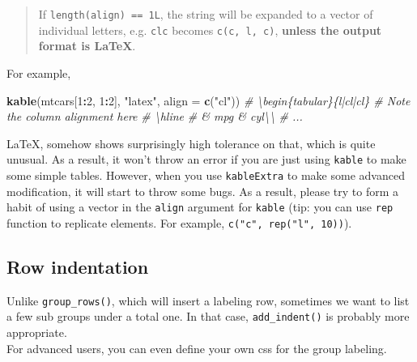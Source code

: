 \documentclass[table]{article}
\newenvironment{Shaded}{\begin{snugshade}}{\end{snugshade}}
\newcommand{\CommentTok}[1]{\textcolor[rgb]{0.56,0.35,0.01}{\textit{#1}}}
\newcommand{\DataTypeTok}[1]{\textcolor[rgb]{0.13,0.29,0.53}{#1}}
\newcommand{\DecValTok}[1]{\textcolor[rgb]{0.00,0.00,0.81}{#1}}
\newcommand{\KeywordTok}[1]{\textcolor[rgb]{0.13,0.29,0.53}{\textbf{#1}}}
\newcommand{\NormalTok}[1]{#1}
\newcommand{\OperatorTok}[1]{\textcolor[rgb]{0.81,0.36,0.00}{\textbf{#1}}}
\newcommand{\StringTok}[1]{\textcolor[rgb]{0.31,0.60,0.02}{#1}}
\begin{document}
\begin{quote}
If \texttt{length(align)\ ==\ 1L}, the string will be expanded to a
vector of individual letters, e.g.
\texttt{\textquotesingle{}clc\textquotesingle{}} becomes
\texttt{c(\textquotesingle{}c\textquotesingle{},\ \textquotesingle{}l\textquotesingle{},\ \textquotesingle{}c\textquotesingle{})},
\textbf{unless the output format is LaTeX}.
\end{quote}

For example,

\begin{Shaded}
\begin{Highlighting}[]
\KeywordTok{kable}\NormalTok{(mtcars[}\DecValTok{1}\OperatorTok{:}\DecValTok{2}\NormalTok{, }\DecValTok{1}\OperatorTok{:}\DecValTok{2}\NormalTok{], }\StringTok{"latex"}\NormalTok{, }\DataTypeTok{align =} \KeywordTok{c}\NormalTok{(}\StringTok{"cl"}\NormalTok{))}
\CommentTok{# \textbackslash{}begin\{tabular\}\{l|cl|cl\}  # Note the column alignment here}
\CommentTok{# \textbackslash{}hline}
\CommentTok{#   & mpg & cyl\textbackslash{}\textbackslash{}}
\CommentTok{# ...}
\end{Highlighting}
\end{Shaded}

LaTeX, somehow shows surprisingly high tolerance on that, which is quite
unusual. As a result, it won't throw an error if you are just using
\texttt{kable} to make some simple tables. However, when you use
\texttt{kableExtra} to make some advanced modification, it will start to
throw some bugs. As a result, please try to form a habit of using a
vector in the \texttt{align} argument for \texttt{kable} (tip: you can
use \texttt{rep} function to replicate elements. For example,
\texttt{c("c",\ rep("l",\ 10))}).

\hypertarget{row-indentation}{%
\subsection{Row indentation}\label{row-indentation}}

Unlike \texttt{group\_rows()}, which will insert a labeling row,
sometimes we want to list a few sub groups under a total one. In that
case, \texttt{add\_indent()} is probably more appropriate.\\
For advanced users, you can even define your own css for the group
labeling.

\begin{Shaded}
\end{Shaded}
\end{document}
